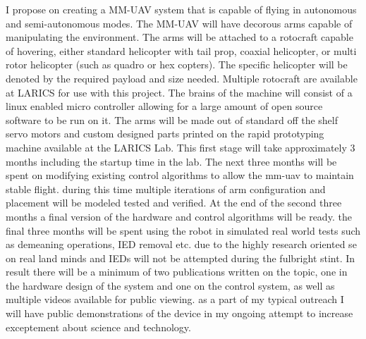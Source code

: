 \documentclass[12pt]{article}
\begin{document}
I propose on creating a MM-UAV system that is capable of flying in autonomous and semi-autonomous 
modes.  The MM-UAV will have decorous arms capable of manipulating the environment.  The arms 
will be attached to a rotocraft capable of hovering, either standard helicopter with tail prop, coaxial 
helicopter, or multi rotor helicopter (such as quadro or hex copters).  The specific helicopter will be 
denoted by the required payload and size needed.  Multiple rotocraft are available at LARICS for use 
with this project.  The brains of the machine will consist of a linux enabled micro controller allowing for 
a large amount of open source software to be run on it.  The arms will be made out of standard off the 
shelf servo motors and custom designed parts printed on the rapid prototyping machine available at 
the LARICS Lab.  This first stage will take approximately 3 months including the startup time in the lab.  
The next three months will be spent on modifying existing control algorithms to allow the mm-uav to 
maintain stable flight.  during this time multiple iterations of arm configuration and placement will be 
modeled tested and verified.  At the end of the second three months a final version of the hardware and 
control algorithms will be ready.  the final three months will be spent using the robot in simulated real 
world tests such as demeaning operations, IED removal etc.  due to the highly research oriented se on 
real land minds and IEDs will not be attempted during the fulbright stint.  In result there will be a 
minimum of two publications written on the topic, one in the hardware design of the system and one on 
the control system, as well as multiple videos available for public viewing.  as a part of my typical 
outreach I will have public demonstrations of the device in my ongoing attempt to increase 
exceptement about science and technology.  
\end{document}
